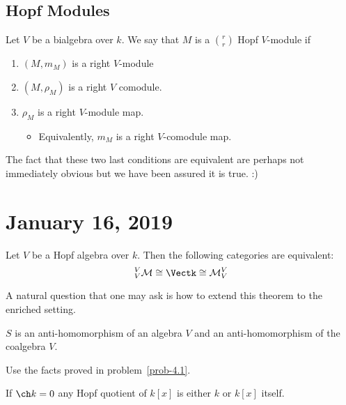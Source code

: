 \documentclass[12pt]{article}
\begin{document}
\subsection{Hopf Modules}\label{subsec-hopfmod}
\begin{defn}
	Let $V$ be a bialgebra over $k$. We say that $M$ is a $\binom{r}{r}$ Hopf $V$-module if
	\begin{enumerate}
		\item $(M,m_M)$ is a right $V$-module
		\item $(M,\rho_M)$ is a right $V$ comodule.
		\item $\rho_M$ is a right $V$-module map.
		\begin{itemize}
			\item Equivalently, $m_M$ is a right $V$-comodule map.
		\end{itemize}
	\end{enumerate}
\end{defn}
\begin{rmk}
	The fact that these two last conditions are equivalent are perhaps not immediately obvious but we
	have been assured it is true. :)
\end{rmk}

\section{January 16, 2019}
\begin{thm}\label{thm-LS69}
	Let $V$ be a Hopf algebra over $k$. Then the following categories are equivalent:
	\[_V^V\mathcal{M}\cong \Vectk\cong \mathcal{M}_V^V\]
\end{thm}

\begin{rmk}
	A natural question that one may ask is how to extend this theorem to the enriched setting.
\end{rmk}

\begin{lem}
	$S$ is an anti-homomorphism of an algebra $V$ and an anti-homomorphism of the coalgebra $V$.
\end{lem}
\begin{prf}
	Use the facts proved in problem~\ref{prob-4.1}.
\end{prf}

\begin{prob}
	If $\ch k=0$ any Hopf quotient of $k[x]$ is either $k$ or $k[x]$ itself.
\end{prob}
\end{document}
